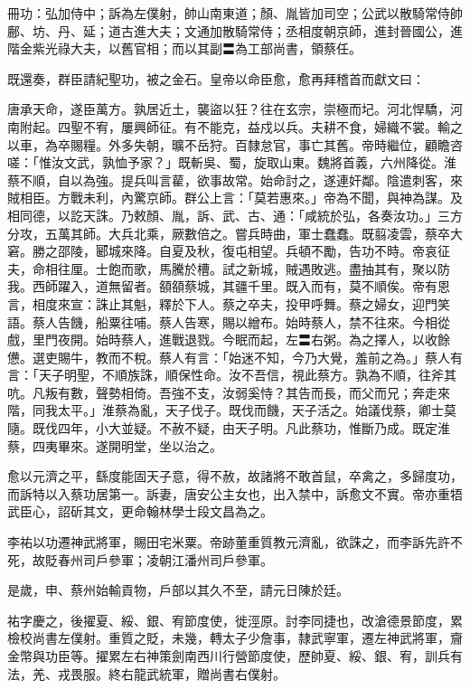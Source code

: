 \begin{pinyinscope}
 冊功：弘加侍中；訴為左僕射，帥山南東道；顏、胤皆加司空；公武以散騎常侍帥鄜、坊、丹、延；道古進大夫；文通加散騎常侍；丞相度朝京師，進封晉國公，進階金紫光祿大夫，以舊官相；而以其副〓為工部尚書，領蔡任。



 既還奏，群臣請紀聖功，被之金石。皇帝以命臣愈，愈再拜稽首而獻文曰：



 唐承天命，遂臣萬方。孰居近土，襲盜以狂？往在玄宗，崇極而圮。河北悍驕，河南附起。四聖不宥，屢興師征。有不能克，益戍以兵。夫耕不食，婦織不裳。輸之以車，為卒賜糧。外多失朝，曠不岳狩。百隸怠官，事亡其舊。帝時繼位，顧瞻咨嗟：「惟汝文武，孰恤予家？」既斬吳、蜀，旋取山東。魏將首義，六州降從。淮蔡不順，自以為強。提兵叫言雚，欲事故常。始命討之，遂連奸鄰。陰遣刺客，來賊相臣。方戰未利，內驚京師。群公上言：「莫若惠來。」帝為不聞，與神為謀。及相同德，以訖天誅。乃敕顏、胤，訴、武、古、通：「咸統於弘，各奏汝功。」三方分攻，五萬其師。大兵北乘，厥數倍之。嘗兵時曲，軍士蠢蠢。既翦凌雲，蔡卒大窘。勝之邵陵，郾城來降。自夏及秋，復屯相望。兵頓不勵，告功不時。帝哀征夫，命相往厘。士飽而歌，馬騰於槽。試之新城，賊遇敗逃。盡抽其有，聚以防我。西師躍入，道無留者。頟頟蔡城，其疆千里。既入而有，莫不順俟。帝有恩言，相度來宣：誅止其魁，釋於下人。蔡之卒夫，投甲呼舞。蔡之婦女，迎門笑語。蔡人告饑，船粟往哺。蔡人告寒，賜以繒布。始時蔡人，禁不往來。今相從戲，里門夜開。始時蔡人，進戰退戮。今眠而起，左〓右粥。為之擇人，以收餘憊。選吏賜牛，教而不稅。蔡人有言：「始迷不知，今乃大覺，羞前之為。」蔡人有言：「天子明聖，不順族誅，順保性命。汝不吾信，視此蔡方。孰為不順，往斧其吭。凡叛有數，聲勢相倚。吾強不支，汝弱奚恃？其告而長，而父而兄；奔走來階，同我太平。」淮蔡為亂，天子伐子。既伐而饑，天子活之。始議伐蔡，卿士莫隨。既伐四年，小大並疑。不赦不疑，由天子明。凡此蔡功，惟斷乃成。既定淮蔡，四夷畢來。遂開明堂，坐以治之。



 愈以元濟之平，繇度能固天子意，得不赦，故諸將不敢首鼠，卒禽之，多歸度功，而訴特以入蔡功居第一。訴妻，唐安公主女也，出入禁中，訴愈文不實。帝亦重牾武臣心，詔斫其文，更命翰林學士段文昌為之。



 李祐以功遷神武將軍，賜田宅米粟。帝跡董重質教元濟亂，欲誅之，而李訴先許不死，故貶春州司戶參軍；凌朝江潘州司戶參軍。



 是歲，申、蔡州始輸貢物，戶部以其久不至，請元日陳於廷。



 祐字慶之，後擢夏、綏、銀、宥節度使，徙涇原。討李同捷也，改滄德景節度，累檢校尚書左僕射。重質之貶，未幾，轉太子少詹事，隸武寧軍，遷左神武將軍，齎金幣與功臣等。擢累左右神策劍南西川行營節度使，歷帥夏、綏、銀、宥，訓兵有法，羌、戎畏服。終右龍武統軍，贈尚書右僕射。




\end{pinyinscope}
